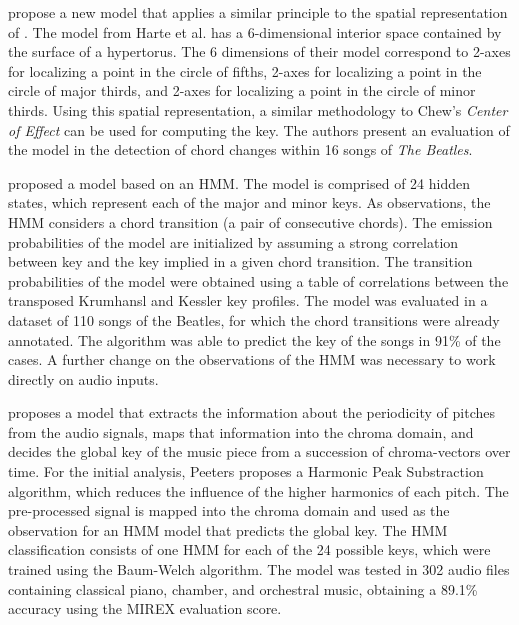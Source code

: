 \textcite{harte2006detecting} propose a new model that
applies a similar principle to the spatial representation of
\textcite{chew2000towards}. The model from Harte et al. has
a 6-dimensional interior space contained by the surface of a
hypertorus. The 6 dimensions of their model correspond to
2-axes for localizing a point in the circle of fifths,
2-axes for localizing a point in the circle of major thirds,
and 2-axes for localizing a point in the circle of minor
thirds. Using this spatial representation, a similar
methodology to Chew's \emph{Center of Effect}
\parencite{chew2002spiral} can be used for computing the
key. The authors present an evaluation of the model in the
detection of chord changes within 16 songs of \emph{The
Beatles}.



\textcite{noland2006key} proposed a model based on an HMM.
The model is comprised of 24 hidden states, which represent
each of the major and minor keys. As observations, the HMM
considers a chord transition (a pair of consecutive chords).
The emission probabilities of the model are initialized by
assuming a strong correlation between key and the key
implied in a given chord transition. The transition
probabilities of the model were obtained using a table of
correlations between the transposed Krumhansl and Kessler
key profiles. The model was evaluated in a dataset of 110
songs of the Beatles, for which the chord transitions were
already annotated. The algorithm was able to predict the key
of the songs in 91\% of the cases. A further change on the
observations of the HMM was necessary to work directly on
audio inputs.


\textcite{peeters2006chromabased} proposes a model that
extracts the information about the periodicity of pitches
from the audio signals, maps that information into the
chroma domain, and decides the global key of the music piece
from a succession of chroma-vectors over time. For the
initial analysis, Peeters proposes a Harmonic Peak
Substraction algorithm, which reduces the influence of the
higher harmonics of each pitch. The pre-processed signal is
mapped into the chroma domain and used as the observation
for an HMM model that predicts the global key. The HMM
classification consists of one HMM for each of the 24
possible keys, which were trained using the Baum-Welch
algorithm. The model was tested in 302 audio files
containing classical piano, chamber, and orchestral music,
obtaining a 89.1\% accuracy using the MIREX evaluation
score.


